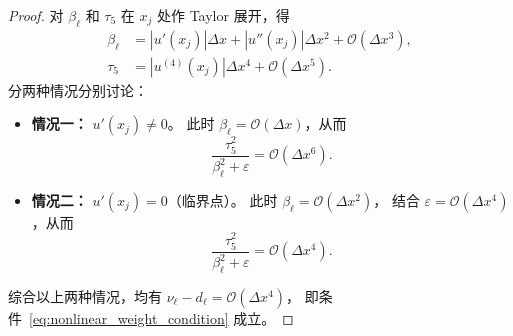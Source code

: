 \documentclass[12pt,a4paper]{article}
\numberwithin{equation}{section}    %
\begin{document}
\begin{proof}
    对 $\beta_\ell$ 和 $\tau_5$ 在 $x_j$ 处作 Taylor 展开，得
    \begin{align}
        \beta_\ell &= \left|u'(x_j)\right|\Delta x
                    + \left|u''(x_j)\right|\Delta x^2
                    + \mathcal{O}(\Delta x^3), \\
        \tau_5     &= \left|u^{(4)}(x_j)\right|\Delta x^4
                    + \mathcal{O}(\Delta x^5).
    \end{align}
    分两种情况分别讨论：
    \begin{itemize}
        \item \textbf{情况一：} $u'(x_j) \neq 0$。
              此时 $\beta_\ell = \mathcal{O}(\Delta x)$，从而
              \[
                  \frac{\tau_5^2}{\beta_\ell^2 + \varepsilon} = \mathcal{O}(\Delta x^6).
              \]
        \item \textbf{情况二：} $u'(x_j) = 0$（临界点）。
              此时 $\beta_\ell = \mathcal{O}(\Delta x^2)$，
              结合 $\varepsilon = \mathcal{O}(\Delta x^4)$，从而
              \[
                  \frac{\tau_5^2}{\beta_\ell^2 + \varepsilon} = \mathcal{O}(\Delta x^4).
              \]
    \end{itemize}
    综合以上两种情况，均有 $\nu_\ell - d_\ell = \mathcal{O}(\Delta x^4)$，
    即条件~\eqref{eq:nonlinear_weight_condition} 成立。
\end{proof}



\end{document}
